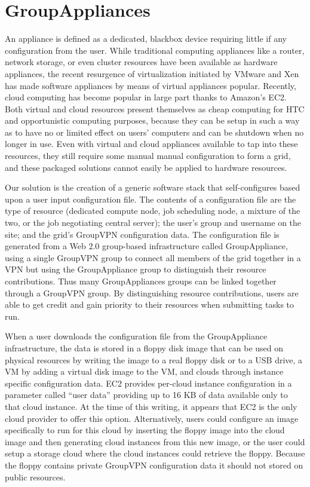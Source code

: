 \section{GroupAppliances}
An appliance is defined as a dedicated, blackbox device requiring little if any
configuration from the user.  While traditional computing appliances like a
router, network storage, or even cluster resources have been available as
hardware appliances, the recent resurgence of virtualization initiated by
VMware and Xen has made software appliances by means of virtual appliances
popular.  Recently, cloud computing has become popular in large part thanks to
Amazon's EC2.  Both virtual and cloud resources present themselves as cheap
computing for HTC and opportunistic computing purposes, because they can be
setup in such a way as to have no or limited effect on users' computers and can
be shutdown when no longer in use.  Even with virtual and cloud appliances 
available to tap into these resources, they still require some manual
manual configuration to form a grid, and these packaged solutions cannot easily
be applied to hardware resources.

Our solution is the creation of a generic software stack that self-configures
based upon a user input configuration file.  The contents of a configuration
file are the type of resource (dedicated compute node, job scheduling node, a
mixture of the two, or the job negotiating central server); the user's group and
username on the site; and the grid's GroupVPN configuration data.  The
configuration file is generated from a Web 2.0 group-based infrastructure
called GroupAppliance, using a single GroupVPN group to connect all members of
the grid together in a VPN but using the GroupAppliance group to distinguish
their resource contributions.  Thus many GroupAppliances groups can be linked
together through a GroupVPN group.  By distinguishing resource contributions,
users are able to get credit and gain priority to their resources when
submitting tasks to run.

When a user downloads the configuration file from the GroupAppliance
infrastructure, the data is stored in a floppy disk image that can be used on
physical resources by writing the image to a real floppy disk or to a USB drive,
a VM by adding a virtual disk image to the VM, and clouds through instance
specific configuration data.  EC2 provides per-cloud instance configuration in a
parameter called ``user data'' providing up to 16 KB of data available only to
that cloud instance.  At the time of this writing, it appears that EC2 is the
only cloud provider to offer this option.  Alternatively, users could configure
an image specifically to run for this cloud by inserting the floppy image into
the cloud image and then generating cloud instances from this new image, or the
user could setup a storage cloud where the cloud instances could retrieve the
floppy.  Because the floppy contains private GroupVPN configuration data it
should not stored on public resources.

